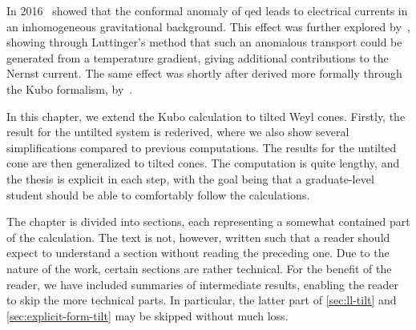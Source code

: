 In 2016~\textcite{chernodubAnomalousTransportDue2016} showed that the conformal anomaly of \gls{qed} leads to electrical currents in an inhomogeneous gravitational background.
This effect was further explored by~\textcite{chernodubGenerationNernstCurrent2018}, showing through Luttinger's method that such an anomalous transport could be generated from a temperature gradient, giving additional contributions to the Nernst current.
The same effect was shortly after derived more formally through the Kubo formalism, by~\textcite{arjonaFingerprintsConformalAnomaly2019}.

In this chapter, we extend the Kubo calculation to tilted Weyl cones.
Firstly, the result for the untilted system is rederived, where we also show several simplifications compared to previous computations.
The results for the untilted cone are then generalized to tilted cones.
The computation is quite lengthy, and the thesis is explicit in each step, with the goal being that a graduate-level student should be able to comfortably follow the calculations.

The chapter is divided into sections, each representing a somewhat contained part of the calculation.
The text is not, however, written such that a reader should expect to understand a section without reading the preceding one.
Due to the nature of the work, certain sections are rather technical.
For the benefit of the reader, we have included summaries of intermediate results, enabling the reader to skip the more technical parts.
In particular, the latter part of \cref{sec:ll-tilt} and \cref{sec:explicit-form-tilt} may be skipped without much loss.

